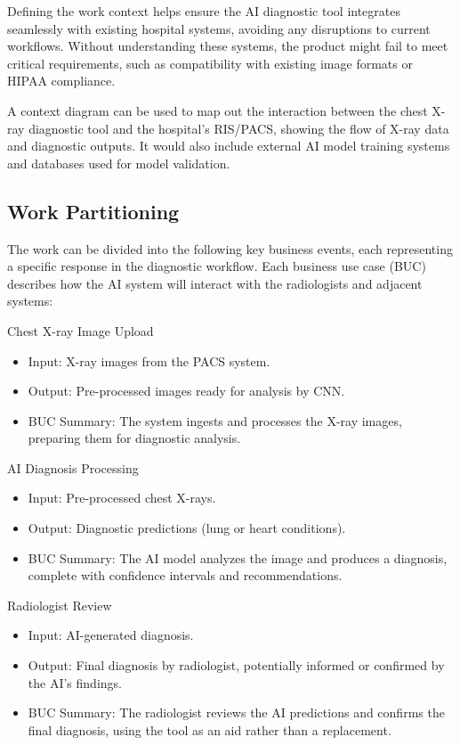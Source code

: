 \documentclass[12pt]{article}
\begin{document}
Defining the work context helps ensure the AI diagnostic tool integrates seamlessly with existing 
hospital systems, avoiding any disruptions to current workflows. Without understanding these 
systems, the product might fail to meet critical requirements, such as compatibility with existing 
image formats or HIPAA compliance.

A context diagram can be used to map out the interaction between the chest X-ray diagnostic tool 
and the hospital’s RIS/PACS, showing the flow of X-ray data and diagnostic outputs. It would also 
include external AI model training systems and databases used for model validation.


\subsection{Work Partitioning}
The work can be divided into the following key business events, each representing a specific 
response in the diagnostic workflow. Each business use case (BUC) describes how the AI system will 
interact with the radiologists and adjacent systems:

Chest X-ray Image Upload
\begin{itemize}
    \item Input: X-ray images from the PACS system.
    \item Output: Pre-processed images ready for analysis by CNN.
    \item BUC Summary: The system ingests and processes the X-ray images, preparing them for 
        diagnostic analysis.
\end{itemize}

AI Diagnosis Processing
\begin{itemize}
    \item Input: Pre-processed chest X-rays.
    \item Output: Diagnostic predictions (lung or heart conditions).
    \item BUC Summary: The AI model analyzes the image and produces a diagnosis, complete with 
        confidence intervals and recommendations.
\end{itemize}

Radiologist Review
\begin{itemize}
    \item Input: AI-generated diagnosis.
    \item Output: Final diagnosis by radiologist, potentially informed or confirmed by the AI’s 
        findings.
    \item BUC Summary: The radiologist reviews the AI predictions and confirms the final 
        diagnosis, using the tool as an aid rather than a replacement.
\end{itemize}
\end{document}
